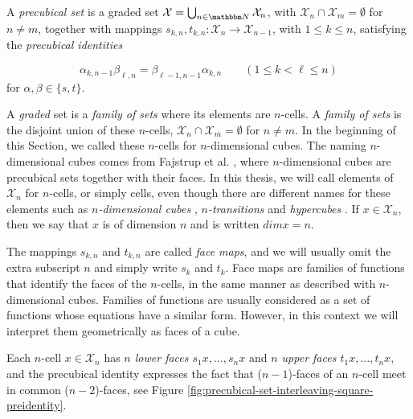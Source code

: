   
    \begin{definition}
        \label{def:precubical-set}
         A \emph{precubical set} is a graded set $\mathcal{X}= \bigcup_{ n\in \Nat} \mathcal{X}_n$, with $\mathcal{X}_n\cap \mathcal{X}_m= \emptyset$ for $n\ne m$, together with mappings $s_{ k, n}, t_{ k, n}:\mathcal{X}_n\to \mathcal{X}_{ n- 1}$, with $1\leq k\leq n$, satisfying the \emph{precubical identities}
         
        
        \begin{equation*}
            \alpha_{ k, n- 1} \beta_{ \ell, n}= \beta_{ \ell- 1, n- 1} \alpha_{ k, n} \qquad(1 \leq k< \ell \leq n)
        \end{equation*}
        for $\alpha, \beta\in\{ s, t\}$.
    \end{definition}
    
    A \emph{graded} set is a \emph{family of sets} where its elements are $n$-cells. A \emph{family of sets} is the disjoint union of these $n$-cells, $\mathcal{X}_n\cap \mathcal{X}_m= \emptyset$ for $n\ne m$. In the beginning of this Section, we called these $n$-cells for $n$-dimensional cubes. The naming $n$-dimensional cubes comes from Fajstrup et al. \cite{Fajstrup16DirectedAlgebraicTopologyConcurrency}, where $n$-dimensional cubes are precubical sets together with their faces. In this thesis, we will call elements of $\mathcal{X}_n$ for $n$-cells,  or simply cells, even though there are different names for these elements such as \emph{$n$-dimensional cubes} \cite{Pratt00Sculptures, Fajstrup16DirectedAlgebraicTopologyConcurrency}, \emph{$n$-transitions} \cite{Goubault95PhDThesis} and \emph{hypercubes} \cite{Glabbeek06HDA}. If $x \in \mathcal{X}_n$, then we say that $x$ is of dimension $n$ and is written $dim x = n$.
    
    The mappings $s_{ k, n}$ and $t_{ k, n}$  are called \emph{face maps}, and we will usually omit the extra subscript $n$ and simply write $s_k$ and $t_k$. Face maps are families of functions that identify the faces of the $n$-cells, in the same manner as described with $n$-dimensional cubes. Families of functions are usually considered as a set of functions whose equations have a similar form. However, in this context we will interpret them geometrically as faces of a cube.
    
    Each $n$-cell $x \in \mathcal{X}_n$ has \emph{$n$ lower faces $s_1 x,\dotsc, s_n x$} and \emph{$n$ upper faces $t_1 x,\dotsc, t_n x$}, and the precubical identity expresses the fact that ($n-1$)-faces of an $n$-cell meet in common ($n-2$)-faces, see Figure \ref{fig:precubical-set-interleaving-square-preidentity}.
    
